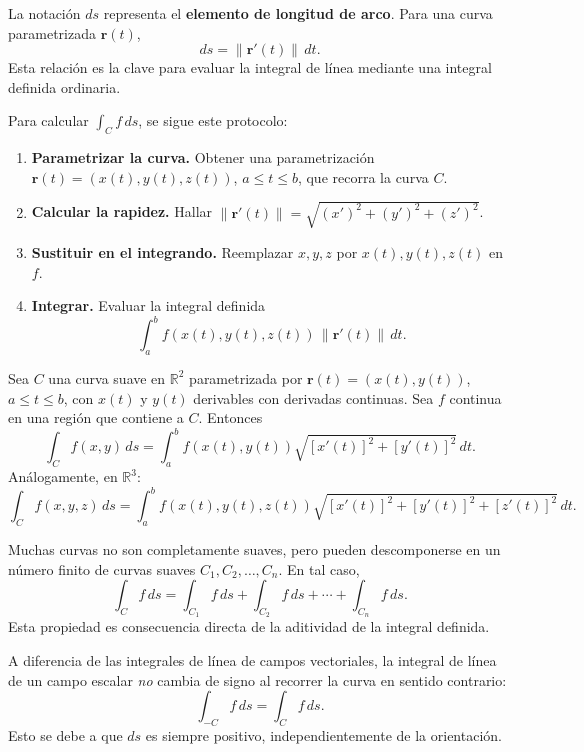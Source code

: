 \begin{rem}
La notación \(ds\) representa el \textbf{elemento de longitud de
arco}. Para una curva parametrizada \(\mathbf{r}(t)\),
\[
ds = \|\mathbf{r}'(t)\|\,dt.
\]
Esta relación es la clave para evaluar la integral de línea mediante
una integral definida ordinaria.
\end{rem}

\begin{pasos}
Para calcular \(\int_C f\,ds\), se sigue este protocolo:
\begin{enumerate}
  \item \textbf{Parametrizar la curva.} Obtener una parametrización
  \(\mathbf{r}(t) = (x(t), y(t), z(t))\), \(a \le t \le b\), que
  recorra la curva \(C\).
  \item \textbf{Calcular la rapidez.} Hallar
  \(\|\mathbf{r}'(t)\| = \sqrt{(x')^2 + (y')^2 + (z')^2}\).
  \item \textbf{Sustituir en el integrando.} Reemplazar \(x,y,z\) por
  \(x(t),y(t),z(t)\) en \(f\).
  \item \textbf{Integrar.} Evaluar la integral definida
  \[
  \int_a^b f(x(t),y(t),z(t)) \,\|\mathbf{r}'(t)\|\,dt.
  \]
\end{enumerate}
\end{pasos}

\begin{theorem}
Sea \(C\) una curva suave en \(\mathbb{R}^2\) parametrizada por
\(\mathbf{r}(t) = (x(t), y(t))\), \(a \le t \le b\), con \(x(t)\) y
\(y(t)\) derivables con derivadas continuas. Sea \(f\) continua en
una región que contiene a \(C\). Entonces
\[
\int_C f(x,y)\,ds =
\int_a^b f(x(t), y(t)) \sqrt{[x'(t)]^2 + [y'(t)]^2}\,dt.
\]
Análogamente, en \(\mathbb{R}^3\):
\[
\int_C f(x,y,z)\,ds =
\int_a^b f(x(t), y(t), z(t)) \sqrt{[x'(t)]^2 + [y'(t)]^2 + [z'(t)]^2}\,dt.
\]
\end{theorem}

\begin{rem}
Muchas curvas no son completamente suaves, pero pueden descomponerse en
un número finito de curvas suaves \(C_1, C_2, \dots, C_n\). En tal caso,
\[
\int_C f\,ds = \int_{C_1} f\,ds + \int_{C_2} f\,ds + \cdots + \int_{C_n} f\,ds.
\]
Esta propiedad es consecuencia directa de la aditividad de la integral
definida.
\end{rem}

\begin{rem}
A diferencia de las integrales de línea de campos vectoriales, la
integral de línea de un campo escalar \emph{no} cambia de signo al
recorrer la curva en sentido contrario:
\[
\int_{-C} f\,ds = \int_C f\,ds.
\]
Esto se debe a que \(ds\) es siempre positivo, independientemente de
la orientación.
\end{rem}

